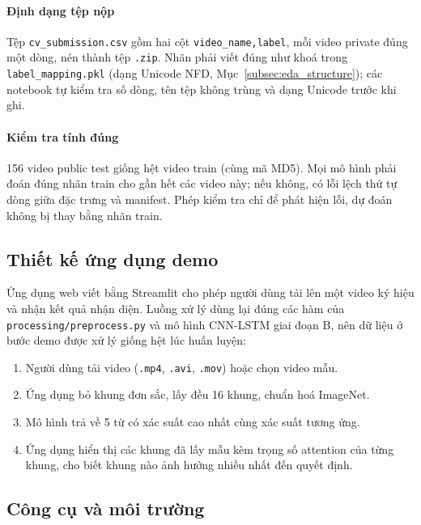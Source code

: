 \paragraph*{Định dạng tệp nộp} Tệp \texttt{cv\_submission.csv} gồm hai cột \texttt{video\_name,label}, mỗi video private đúng một dòng, nén thành tệp \texttt{.zip}. Nhãn phải viết đúng như khoá trong \texttt{label\_mapping.pkl} (dạng Unicode NFD, Mục~\ref{subsec:eda_structure}); các notebook tự kiểm tra số dòng, tên tệp không trùng và dạng Unicode trước khi ghi.

\paragraph*{Kiểm tra tính đúng} 156 video public test giống hệt video train (cùng mã MD5). Mọi mô hình phải đoán đúng nhãn train cho gần hết các video này; nếu không, có lỗi lệch thứ tự dòng giữa đặc trưng và manifest. Phép kiểm tra chỉ để phát hiện lỗi, dự đoán không bị thay bằng nhãn train.

\subsection{Thiết kế ứng dụng demo}
\label{subsec:demo_design}

Ứng dụng web viết bằng Streamlit cho phép người dùng tải lên một video ký hiệu và nhận kết quả nhận diện. Luồng xử lý dùng lại đúng các hàm của \texttt{processing/preprocess.py} và mô hình CNN-LSTM giai đoạn B, nên dữ liệu ở bước demo được xử lý giống hệt lúc huấn luyện:
\begin{enumerate}
  \item Người dùng tải video (\texttt{.mp4}, \texttt{.avi}, \texttt{.mov}) hoặc chọn video mẫu.
  \item Ứng dụng bỏ khung đơn sắc, lấy đều 16 khung, chuẩn hoá ImageNet.
  \item Mô hình trả về 5 từ có xác suất cao nhất cùng xác suất tương ứng.
  \item Ứng dụng hiển thị các khung đã lấy mẫu kèm trọng số attention của từng khung, cho biết khung nào ảnh hưởng nhiều nhất đến quyết định.
\end{enumerate}

\subsection{Công cụ và môi trường}
\label{subsec:tools}


